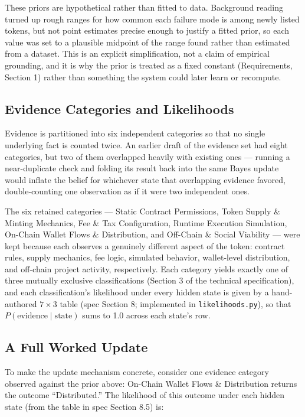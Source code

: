 \documentclass[11pt]{article}
\begin{document}
These priors are hypothetical rather than fitted to data. Background reading turned up rough ranges for how common each failure mode is among newly listed tokens, but not point estimates precise enough to justify a fitted prior, so each value was set to a plausible midpoint of the range found rather than estimated from a dataset. This is an explicit simplification, not a claim of empirical grounding, and it is why the prior is treated as a fixed constant (Requirements, Section 1) rather than something the system could later learn or recompute.

\subsection{Evidence Categories and Likelihoods}

Evidence is partitioned into six independent categories so that no single underlying fact is counted twice. An earlier draft of the evidence set had eight categories, but two of them overlapped heavily with existing ones --- running a near-duplicate check and folding its result back into the same Bayes update would inflate the belief for whichever state that overlapping evidence favored, double-counting one observation as if it were two independent ones.

The six retained categories --- Static Contract Permissions, Token Supply \& Minting Mechanics, Fee \& Tax Configuration, Runtime Execution Simulation, On-Chain Wallet Flows \& Distribution, and Off-Chain \& Social Viability --- were kept because each observes a genuinely different aspect of the token: contract rules, supply mechanics, fee logic, simulated behavior, wallet-level distribution, and off-chain project activity, respectively. Each category yields exactly one of three mutually exclusive classifications (Section 3 of the technical specification), and each classification's likelihood under every hidden state is given by a hand-authored $7\times3$ table (spec Section 8; implemented in \texttt{likelihoods.py}), so that $P(\text{evidence}\mid\text{state})$ sums to 1.0 across each state's row.

\subsection{A Full Worked Update}

To make the update mechanism concrete, consider one evidence category observed against the prior above: On-Chain Wallet Flows \& Distribution returns the outcome ``Distributed.'' The likelihood of this outcome under each hidden state (from the table in spec Section 8.5) is:
\end{document}
